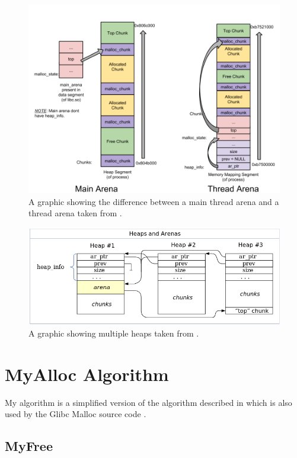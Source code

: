 \documentclass{article}
\begin{document}
\begin{figure}[!htb]
  \caption{A graphic showing the difference between a main thread arena and a thread arena taken from \cite{sploitfun}.}
  \center
\includegraphics[scale=0.2]{image/mainvsthreadarena.png}
\end{figure}

\begin{figure}[!htb]
  \caption{A graphic showing multiple heaps taken from \cite{mallocinternals}.}
  \center
  \includegraphics[scale=0.35]{image/multipleheaps.png}
\end{figure}

\newpage

\section{MyAlloc Algorithm}

My algorithm is a simplified version of the algorithm described in \cite{mallocinternals} which is also used by the Glibc Malloc source code \cite{malloc}.

\subsection{MyFree}
\end{document}
